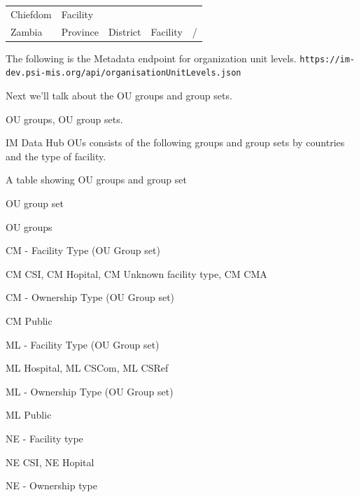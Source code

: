 \documentclass[]{book}
\begin{document}
\begin{longtable}[]{@{}lllll@{}}
\begin{minipage}[t]{0.20\columnwidth}
Chiefdom\strut
\end{minipage} & \begin{minipage}[t]{0.20\columnwidth}\raggedright
Facility\strut
\end{minipage}\tabularnewline
\begin{minipage}[t]{0.07\columnwidth}\raggedright
Zambia\strut
\end{minipage} & \begin{minipage}[t]{0.20\columnwidth}\raggedright
Province\strut
\end{minipage} & \begin{minipage}[t]{0.20\columnwidth}\raggedright
District\strut
\end{minipage} & \begin{minipage}[t]{0.20\columnwidth}\raggedright
Facility\strut
\end{minipage} & \begin{minipage}[t]{0.20\columnwidth}\raggedright
/\strut
\end{minipage}\tabularnewline
\bottomrule
\end{longtable}

The following is the Metadata endpoint for organization unit levels.
\texttt{https://im-dev.psi-mis.org/api/organisationUnitLevels.json}

Next we'll talk about the OU groups and group sets.

OU groups, OU group sets.

IM Data Hub OUs consists of the following groups and group sets by countries and the type of facility.

\label{tab:unnamed-chunk-12}A table showing OU groups and group set

OU group set

OU groups

CM - Facility Type (OU Group set)

CM CSI, CM Hopital, CM Unknown facility type, CM CMA

CM - Ownership Type (OU Group set)

CM Public

ML - Facility Type (OU Group set)

ML Hospital, ML CSCom, ML CSRef

ML - Ownership Type (OU Group set)

ML Public

NE - Facility type

NE CSI, NE Hopital

NE - Ownership type
\end{document}
